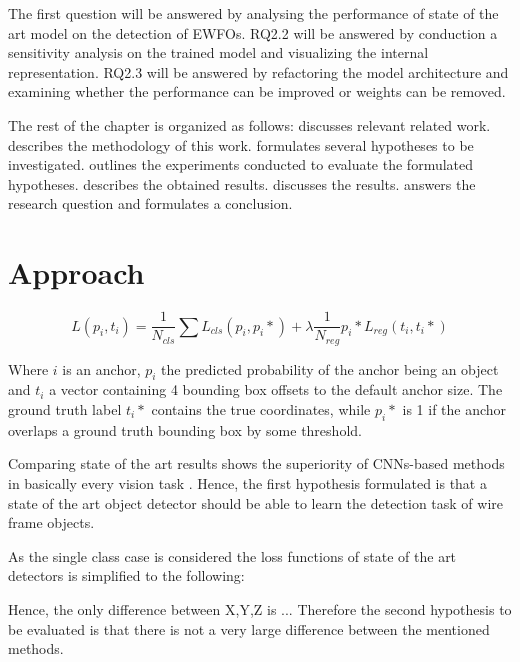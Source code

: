 	The first question will be answered by analysing the performance of state of the art model on the detection of \acp{EWFO}. RQ2.2 will be answered by conduction a sensitivity analysis on the trained model and visualizing the internal representation. RQ2.3 will be answered by refactoring the model architecture and examining whether the performance can be improved or weights can be removed.

	The rest of the chapter is organized as follows:  discusses relevant related work.  describes the methodology of this work.  formulates several hypotheses to be investigated.  outlines the experiments conducted to evaluate the formulated hypotheses.  describes the obtained results.  discusses the results.  answers the research question and formulates a conclusion.



\section{Approach}
\label{sec:object_detection:approach}
	$$
	L({p_i},{t_i}) = \frac{1}{N_{cls}} \sum L_{cls}(p_i,p_i*) + \lambda \frac{1}{N_{reg}} p_i* L_{reg}(t_i,t_i*)
	$$
	
	Where $i$ is an anchor, $p_i$ the predicted probability of the anchor being an object and $t_i$ a vector containing 4 bounding box offsets to the default anchor size. The ground truth label $t_i*$ contains the true coordinates, while $p_i*$ is 1 if the anchor overlaps a ground truth bounding box by some threshold. 


Comparing state of the art results shows the superiority of \acp{CNN}-based methods in basically every vision task . Hence, the first hypothesis formulated is that a state of the art object detector should be able to learn the detection task of wire frame objects. 

As the single class case is considered the loss functions of state of the art detectors is simplified to the following:


Hence, the only difference between X,Y,Z is ...
Therefore the second hypothesis to be evaluated is that there is not a very large difference between the mentioned methods.


